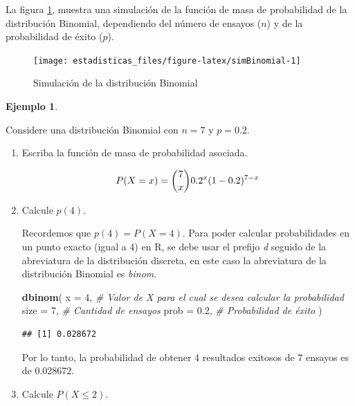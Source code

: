 \documentclass[
  11pt,
]{book}
\newenvironment{Shaded}{\begin{snugshade}}{\end{snugshade}}
\newcommand{\AttributeTok}[1]{\textcolor[rgb]{0.13,0.29,0.53}{#1}}
\newcommand{\CommentTok}[1]{\textcolor[rgb]{0.56,0.35,0.01}{\textit{#1}}}
\newcommand{\DecValTok}[1]{\textcolor[rgb]{0.00,0.00,0.81}{#1}}
\newcommand{\FloatTok}[1]{\textcolor[rgb]{0.00,0.00,0.81}{#1}}
\newcommand{\FunctionTok}[1]{\textcolor[rgb]{0.13,0.29,0.53}{\textbf{#1}}}
\newcommand{\NormalTok}[1]{#1}
\theoremstyle{definition}
\theoremstyle{definition}
\newtheorem{example}{Ejemplo}[chapter]
\theoremstyle{definition}
\theoremstyle{definition}
\theoremstyle{remark}
\begin{document}
La figura \ref{fig:simBinomial}, muestra una simulación de la función de masa de probabilidad de la distribución Binomial, dependiendo del número de ensayos (\(n\)) y de la probabilidad de éxito (\(p\)).

\begin{figure}

{\centering \texttt{[image: estadisticas\_files/figure-latex/simBinomial-1]} 

}

\caption{Simulación de la distribución Binomial}\label{fig:simBinomial}
\end{figure}

\begin{example}
\protect\hypertarget{exm:ejcomandosbin}{}\label{exm:ejcomandosbin}

Considere una distribución Binomial con \(n = 7\) y \(p = 0.2\).

\begin{enumerate}
\def\labelenumi{\alph{enumi}.}
\item
  Escriba la función de masa de probabilidad asociada.

  \begin{equation}
  \notag
  P(X=x) = \binom{7}{x}0.2^x(1-0.2)^{7-x}
  \end{equation}
\item
  Calcule \(p(4)\).

  Recordemos que \(p(4) = P(X = 4)\). Para poder calcular probabilidades en un punto exacto (igual a 4) en R, se debe usar el prefijo \emph{d} seguido de la abreviatura de la distribución discreta, en este caso la abreviatura de la distribución Binomial es \emph{binom}.

\begin{Shaded}
\begin{Highlighting}[]
\FunctionTok{dbinom}\NormalTok{(}
  \AttributeTok{x =} \DecValTok{4}\NormalTok{, }\CommentTok{\# Valor de X para el cual se desea calcular la probabilidad}
  \AttributeTok{size =} \DecValTok{7}\NormalTok{, }\CommentTok{\# Cantidad de ensayos}
  \AttributeTok{prob =} \FloatTok{0.2}\NormalTok{, }\CommentTok{\# Probabilidad de éxito}
\NormalTok{)}
\end{Highlighting}
\end{Shaded}

\begin{verbatim}
## [1] 0.028672
\end{verbatim}

  Por lo tanto, la probabilidad de obtener 4 resultados exitosos de 7 ensayos es de 0.028672.
\item
  Calcule \(P(X\leq 2)\).


\end{enumerate}
\end{example}
\end{document}
